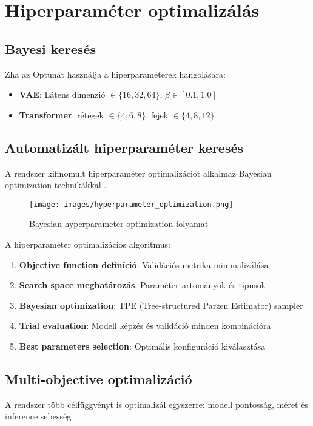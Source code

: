 \section{Hiperparaméter optimalizálás}

\subsection{Bayesi keresés}
Zha az Optunát használja a hiperparaméterek hangolására:
\begin{itemize}
    \item \textbf{VAE}: Látens dimenzió $\in \{16, 32, 64\}$, $\beta \in [0.1, 1.0]$
    \item \textbf{Transformer}: rétegek $\in \{4,6,8\}$, fejek $\in \{4,8,12\}$
\end{itemize}

\subsection{Automatizált hiperparaméter keresés}
A rendszer kifinomult hiperparaméter optimalizációt alkalmaz Bayesian optimization technikákkal \cite{optuna2019}.

\begin{figure}[h]
\centering
\texttt{[image: images/hyperparameter\_optimization.png]}
\caption{Bayesian hyperparameter optimization folyamat}
\label{fig:hyperopt}
\end{figure}

A hiperparaméter optimalizációs algoritmus:
\begin{enumerate}
\item \textbf{Objective function definíció}: Validációs metrika minimalizálása
\item \textbf{Search space meghatározás}: Paramétertartományok és típusok
\item \textbf{Bayesian optimization}: TPE (Tree-structured Parzen Estimator) sampler
\item \textbf{Trial evaluation}: Modell képzés és validáció minden kombinációra
\item \textbf{Best parameters selection}: Optimális konfiguráció kiválasztása
\end{enumerate}

\subsection{Multi-objective optimalizáció}
A rendszer több célfüggvényt is optimalizál egyszerre: modell pontosság, méret és inference sebesség \cite{optuna2019}.

